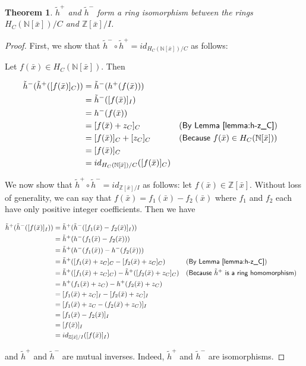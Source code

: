 \documentclass{msthesis}
\newtheorem{theorem}{Theorem}[section]
\theoremstyle{definition}
\newcommand{\ints}{\mathbb{Z}}
\newcommand{\nat}{\mathbb{N}}
\begin{document}
\begin{theorem}
    $\tilde{h}^+$ and $\tilde{h}^-$ form a ring isomorphism between the rings $H_C(\nat[\bar{x}])/C$ and $\ints[\bar{x}]/I$.
\end{theorem}
\begin{proof}
    First, we show that $\tilde{h}^- \circ \tilde{h}^+ = id_{H_C(\nat[\bar{x}])/C}$ as follows:

    Let $f(\bar{x}) \in H_C(\nat[\bar{x}])$.  Then

    \begin{align*}
        \tilde{h}^- (\tilde{h}^+([f(\bar{x})]_C)) &= \tilde{h}^-(h^+(f(\bar{x}))) \\
        &= \tilde{h}^-([f(\bar{x})]_I) \\
        &= h^-(f(\bar{x})) \\
        &= [f(\bar{x}) + z_C]_C && (\textsf{By Lemma \ref{lemma:h-z_C}}) \\
        &= [f(\bar{x})]_C + [z_C]_C && (\textsf{Because $f(\bar{x}) \in H_C(\nat[\bar{x}])$}) \\
        &= [f(\bar{x})]_C \\
        &= id_{H_C(\nat[\bar{x}])/C}([f(\bar{x})]_C)
    \end{align*}

    We now show that $\tilde{h}^+ \circ \tilde{h}^- = id_{\ints[\bar{x}]/I}$ as follows: let $f(\bar{x}) \in \ints[\bar{x}]$. Without loss of generality, we can say that $f(\bar{x}) = f_1(\bar{x}) - f_2(\bar{x})$ where $f_1$ and $f_2$ each have only positive integer coefficients.  Then we have

    \begin{align*}
        \tilde{h}^+ (\tilde{h}^-([f(\bar{x})]_I)) &= \tilde{h}^+ (\tilde{h}^-([f_1(\bar{x}) - f_2(\bar{x})]_I)) \\
        &= \tilde{h}^+ (h^-(f_1(\bar{x}) - f_2(\bar{x}))) \\
        &= \tilde{h}^+(h^-(f_1(\bar{x})) - h^-(f_2(\bar{x}))) \\
        &= \tilde{h}^+([f_1(\bar{x}) + z_C]_C - [f_2(\bar{x}) + z_C]_C) && (\textsf{By Lemma \ref{lemma:h-z_C}}) \\
        &= \tilde{h}^+([f_1(\bar{x}) + z_C]_C) - \tilde{h}^+([f_2(\bar{x}) + z_C]_C) && (\textsf{Because $\tilde{h}^+$ is a ring homomorphism}) \\
        &= h^+(f_1(\bar{x}) + z_C) - h^+(f_2(\bar{x}) + z_C) \\
        &= [f_1(\bar{x}) + z_C]_I - [f_2(\bar{x}) + z_C]_I \\
        &= [f_1(\bar{x}) + z_C - (f_2(\bar{x}) + z_C)]_I \\
        &= [f_1(\bar{x}) - f_2(\bar{x})]_I \\
        &= [f(\bar{x})]_I \\
        &= id_{\ints[\bar{x}]/I}([f(\bar{x})]_I)
    \end{align*}

    and $\tilde{h}^+$ and $\tilde{h}^-$ are mutual inverses.  Indeed, $\tilde{h}^+$ and $\tilde{h}^-$ are isomorphisms.
\end{proof}
\end{document}
